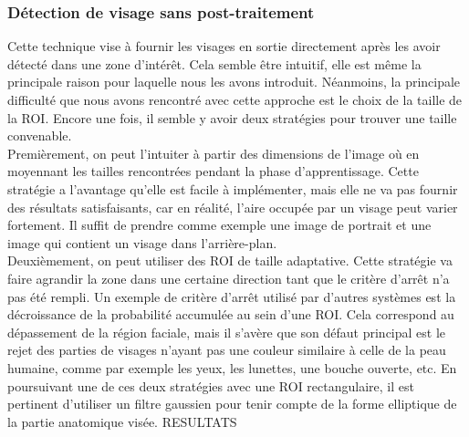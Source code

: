 \documentclass[a4paper,11pt]{article}
\begin{document}
\subsubsection{Détection de visage sans post-traitement}
Cette technique vise à fournir les visages en sortie directement après les avoir détecté dans une zone d'intérêt.
Cela semble être intuitif, elle est même la principale raison pour laquelle nous les avons introduit.
Néanmoins, la principale difficulté que nous avons rencontré avec cette approche est le choix de la taille de la ROI.
Encore une fois, il semble y avoir deux stratégies pour trouver une taille convenable.\\
\newline
Premièrement, on peut l'intuiter à partir des dimensions de l'image où en moyennant les tailles rencontrées pendant la phase d'apprentissage.
Cette stratégie a l'avantage qu'elle est facile à implémenter, mais elle ne va pas fournir des résultats satisfaisants, car en réalité, l'aire occupée par un visage peut varier fortement.
Il suffit de prendre comme exemple une image de portrait et une image qui contient un visage dans l'arrière-plan.\\
\newline
Deuxièmement, on peut utiliser des ROI de taille adaptative. 
Cette stratégie va faire agrandir la zone dans une certaine direction tant que le critère d'arrêt n'a pas été rempli.
Un exemple de critère d'arrêt utilisé par d'autres systèmes est la décroissance de la probabilité accumulée au sein d'une ROI.
Cela correspond au dépassement de la région faciale, mais il s'avère que son défaut principal est le rejet des parties de visages n'ayant pas une couleur similaire à celle de la peau humaine, comme par exemple les yeux, les lunettes, une bouche ouverte, etc.
\newline
\newline
En poursuivant une de ces deux stratégies avec une ROI rectangulaire, il est pertinent d'utiliser un filtre gaussien pour tenir compte de la forme elliptique de la partie anatomique visée.
RESULTATS
\end{document}
